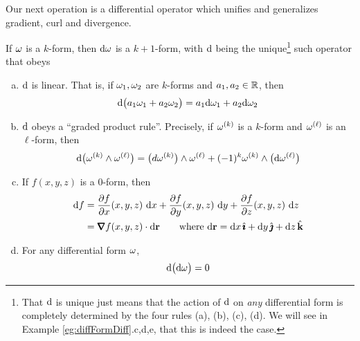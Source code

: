 Our next operation is a differential operator which unifies and generalizes
gradient, curl and divergence.

\begin{defn}
             \label{def:differentialFormDiff}
If $\omega$ is a $k$-form, then $\mathrm{d}\omega$ is a $k+1$-form, with
$\mathrm{d}$ being the unique\footnote{That $\mathrm{d}$ is unique just means that
the action of $\mathrm{d}$ on \emph{any} differential form is completely 
determined by the four rules (a), (b), (c), (d). We will see in 
Example \ref{eg:diffFormDiff}.c,d,e, that this is indeed the case.} 
such operator that obeys
\begin{enumerate}[(a)]
\item
$\mathrm{d}$ is linear. That is, if $\omega_1,\omega_2$ are $k$-forms and 
$a_1,a_2\in\mathbb{R}$, then 
\begin{equation*}
\mathrm{d}\big(a_1\omega_1+a_2\omega_2\big)
=a_1\mathrm{d}\omega_1+a_2\mathrm{d}\omega_2
\end{equation*}

\item
$\mathrm{d}$ obeys a ``graded product rule''. Precisely, if $\omega^{(k)}$ is a 
$k$-form and $\omega^{(\ell)}$ is an $\ell$-form, then 
\begin{equation*}
\mathrm{d}\big(\omega^{(k)}\wedge\omega^{(\ell)}\big)
=\big(d\omega^{(k)}\big)\wedge\omega^{(\ell)}
+(-1)^k\omega^{(k)} \wedge \big(\mathrm{d}\omega^{(\ell)}\big)
\end{equation*}

\item
If $f(x,y,z)$ is a $0$-form, then
\begin{align*}
\dee{f}
&=\frac{\partial f}{\partial x}(x,y,z)\ \dee{x}
+\frac{\partial f}{\partial y}(x,y,z)\ \dee{y}
+\frac{\partial f}{\partial z}(x,y,z)\ \dee{z} \\
&=\vnabla f(x,y,z)\cdot\dee{\vr}
\qquad\text{where }
\dee{\vr} = \dee{x}\,\hi + \dee{y}\,\hj + \dee{z}\,\hk
\end{align*}

\item
For any differential form $\omega$, 
\begin{equation*}
\mathrm{d}\big(\mathrm{d}\omega\big)=0
\end{equation*}
\end{enumerate}
\end{defn}

